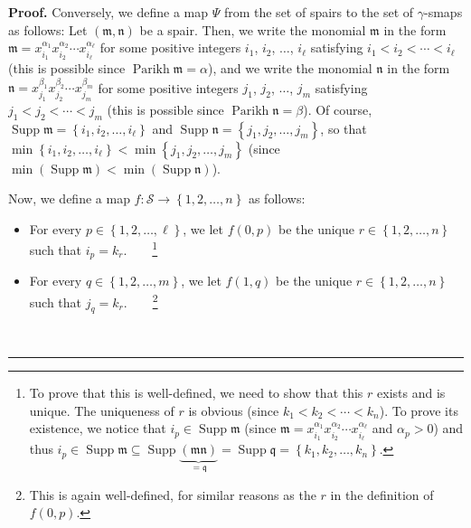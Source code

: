 \documentclass[numbers=enddot,12pt,final,onecolumn,notitlepage,abstracton]{scrartcl}%
\theoremstyle{definition}
\newenvironment{proof}[1][Proof]{\noindent\textbf{#1.} }{\ \rule{0.5em}{0.5em}}
\newenvironment{verlong}{}{}
\begin{document}
\begin{proof}
\begin{verlong}
Conversely, we define a map $\Psi$ from the set of spairs to the set of
$\gamma$-smaps as follows: Let $\left(  \mathfrak{m},\mathfrak{n}\right)  $ be
a spair. Then, we write the monomial $\mathfrak{m}$ in the form $\mathfrak{m}%
=x_{i_{1}}^{\alpha_{1}}x_{i_{2}}^{\alpha_{2}}\cdots x_{i_{\ell}}^{\alpha
_{\ell}}$ for some positive integers $i_{1}$, $i_{2}$, $\ldots$, $i_{\ell}$
satisfying $i_{1}<i_{2}<\cdots<i_{\ell}$ (this is possible since
$\operatorname*{Parikh}\mathfrak{m}=\alpha$), and we write the monomial
$\mathfrak{n}$ in the form $\mathfrak{n}=x_{j_{1}}^{\beta_{1}}x_{j_{2}}%
^{\beta_{2}}\cdots x_{j_{m}}^{\beta_{m}}$ for some positive integers $j_{1}$,
$j_{2}$, $\ldots$, $j_{m}$ satisfying $j_{1}<j_{2}<\cdots<j_{m}$ (this is
possible since $\operatorname*{Parikh}\mathfrak{n}=\beta$). Of course,
$\operatorname*{Supp}\mathfrak{m}=\left\{  i_{1},i_{2},\ldots,i_{\ell
}\right\}  $ and $\operatorname*{Supp}\mathfrak{n}=\left\{  j_{1},j_{2}%
,\ldots,j_{m}\right\}  $, so that $\min\left\{  i_{1},i_{2},\ldots,i_{\ell
}\right\}  <\min\left\{  j_{1},j_{2},\ldots,j_{m}\right\}  $ (since
$\min\left(  \operatorname*{Supp}\mathfrak{m}\right)  <\min\left(
\operatorname*{Supp}\mathfrak{n}\right)  $).

Now, we define a map $f:\mathcal{S}\rightarrow\left\{  1,2,\ldots,n\right\}  $
as follows:

\begin{itemize}
\item For every $p\in\left\{  1,2,\ldots,\ell\right\}  $, we let $f\left(
0,p\right)  $ be the unique $r\in\left\{  1,2,\ldots,n\right\}  $ such that
$i_{p}=k_{r}$.\ \ \ \ \footnote{To prove that this is well-defined, we need to
show that this $r$ exists and is unique. The uniqueness of $r$ is obvious
(since $k_{1}<k_{2}<\cdots<k_{n}$). To prove its existence, we notice that
$i_{p}\in\operatorname*{Supp}\mathfrak{m}$ (since $\mathfrak{m}=x_{i_{1}%
}^{\alpha_{1}}x_{i_{2}}^{\alpha_{2}}\cdots x_{i_{\ell}}^{\alpha_{\ell}}$ and
$\alpha_{p}>0$) and thus $i_{p}\in\operatorname*{Supp}\mathfrak{m}%
\subseteq\operatorname*{Supp}\underbrace{\left(  \mathfrak{mn}\right)
}_{=\mathfrak{q}}=\operatorname*{Supp}\mathfrak{q}=\left\{  k_{1},k_{2}%
,\ldots,k_{n}\right\}  $.}

\item For every $q\in\left\{  1,2,\ldots,m\right\}  $, we let $f\left(
1,q\right)  $ be the unique $r\in\left\{  1,2,\ldots,n\right\}  $ such that
$j_{q}=k_{r}$.\ \ \ \ \footnote{This is again well-defined, for similar
reasons as the $r$ in the definition of $f\left(  0,p\right)  $.}
\end{itemize}


\end{verlong}
\end{proof}
\end{document}
